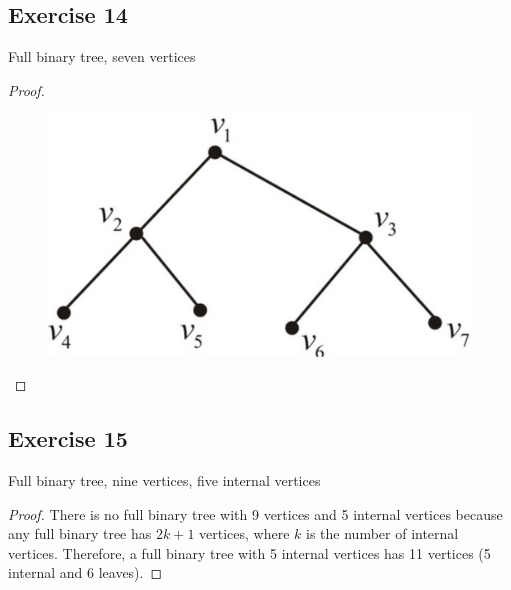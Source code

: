 \documentclass[14pt]{extarticle}
\begin{document}
\subsection{Exercise 14}
Full binary tree, seven vertices
\begin{proof}
\begin{figure}[ht!]
\centering
\includegraphics[scale=0.1]{../images/10.5.14.png}
\end{figure}
\end{proof}

\subsection{Exercise 15}
Full binary tree, nine vertices, five internal vertices
\begin{proof}
There is no full binary tree with 9 vertices and 5 internal vertices because any full binary tree has \(2k+1\) vertices, 
where \(k\) is the number of internal vertices. Therefore, a full binary tree with 5 internal vertices has 11 vertices 
(5 internal and 6 leaves).
\end{proof}
\end{document}
